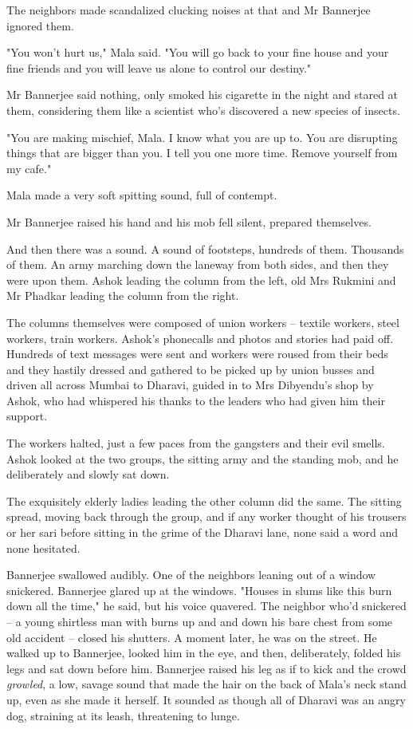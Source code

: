The neighbors made scandalized clucking noises at that and Mr
Bannerjee ignored them.

"You won't hurt us," Mala said. "You will go back to your fine
house and your fine friends and you will leave us alone to control
our destiny."

Mr Bannerjee said nothing, only smoked his cigarette in the night
and stared at them, considering them like a scientist who's
discovered a new species of insects.

"You are making mischief, Mala. I know what you are up to. You are
disrupting things that are bigger than you. I tell you one more
time. Remove yourself from my cafe."

Mala made a very soft spitting sound, full of contempt.

Mr Bannerjee raised his hand and his mob fell silent, prepared
themselves.

And then there was a sound. A sound of footsteps, hundreds of them.
Thousands of them. An army marching down the laneway from both
sides, and then they were upon them. Ashok leading the column from
the left, old Mrs Rukmini and Mr Phadkar leading the column from
the right.

The columns themselves were composed of union workers -- textile
workers, steel workers, train workers. Ashok's phonecalls and
photos and stories had paid off. Hundreds of text messages were
sent and workers were roused from their beds and they hastily
dressed and gathered to be picked up by union busses and driven all
across Mumbai to Dharavi, guided in to Mrs Dibyendu's shop by
Ashok, who had whispered his thanks to the leaders who had given
him their support.

The workers halted, just a few paces from the gangsters and their
evil smells. Ashok looked at the two groups, the sitting army and
the standing mob, and he deliberately and slowly sat down.

The exquisitely elderly ladies leading the other column did the
same. The sitting spread, moving back through the group, and if any
worker thought of his trousers or her sari before sitting in the
grime of the Dharavi lane, none said a word and none hesitated.

Bannerjee swallowed audibly. One of the neighbors leaning out of a
window snickered. Bannerjee glared up at the windows. "Houses in
slums like this burn down all the time," he said, but his voice
quavered. The neighbor who'd snickered -- a young shirtless man
with burns up and and down his bare chest from some old accident --
closed his shutters. A moment later, he was on the street. He
walked up to Bannerjee, looked him in the eye, and then,
deliberately, folded his legs and sat down before him. Bannerjee
raised his leg as if to kick and the crowd \emph{growled}, a low,
savage sound that made the hair on the back of Mala's neck stand
up, even as she made it herself. It sounded as though all of
Dharavi was an angry dog, straining at its leash, threatening to
lunge.

